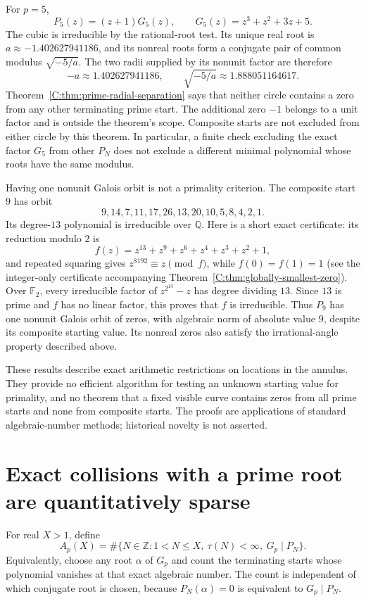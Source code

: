 \documentclass[11pt,a4paper]{article}
\theoremstyle{definition}
\theoremstyle{remark}
\numberwithin{equation}{section}
\begin{document}
For $p=5$,
\[
 P_5(z)=(z+1)G_5(z),\qquad G_5(z)=z^3+z^2+3z+5.
\]
The cubic is irreducible by the rational-root test. Its unique real
root is $a\approx-1.402627941186$, and its nonreal roots form a
conjugate pair of common modulus $\sqrt{-5/a}$.
The two radii supplied by its nonunit factor are therefore
\[
 -a\approx1.402627941186,\qquad
 \sqrt{-5/a}\approx1.888051164617.
\]
Theorem~\ref{C:thm:prime-radial-separation} says that neither circle
contains a zero from any other terminating prime start. The additional
zero $-1$ belongs to a unit factor and is outside the theorem's scope.
Composite starts are not excluded from either circle by this theorem.
In particular, a finite check excluding the exact factor $G_5$ from
other $P_N$ does not exclude a different minimal polynomial whose roots
have the same modulus.

Having one nonunit Galois orbit is not a primality criterion. The
composite start $9$ has orbit
\[
 9,14,7,11,17,26,13,20,10,5,8,4,2,1.
\]
Its degree-$13$ polynomial is irreducible over $\mathbb Q$. Here is a
short exact certificate: its reduction modulo $2$ is
\[
 f(z)=z^{13}+z^9+z^6+z^4+z^3+z^2+1,
\]
and repeated squaring gives $z^{8192}\equiv z\pmod f$, while
$f(0)=f(1)=1$ (see the integer-only certificate accompanying Theorem~\ref{C:thm:globally-smallest-zero}). Over $\mathbb F_2$, every irreducible factor of
$z^{2^{13}}-z$ has degree dividing $13$. Since $13$ is prime and
$f$ has no linear factor, this proves that $f$ is irreducible.
Thus $P_9$ has one nonunit Galois orbit of zeros, with algebraic norm
of absolute value $9$, despite its composite starting value.
Its nonreal zeros also satisfy the irrational-angle property described
above.

These results describe exact arithmetic restrictions on locations in
the annulus. They provide no efficient algorithm for testing an unknown
starting value for primality, and no theorem that a fixed visible curve
contains zeros from all prime starts and none from composite starts.
The proofs are applications of standard algebraic-number methods;
historical novelty is not asserted.
\section{Exact collisions with a prime root are quantitatively sparse}

For real $X>1$, define
\[
 A_p(X)=\#\{N\in\mathbb Z:1<N\le X,\ \tau(N)<\infty,
                         \ G_p\mid P_N\}.
\]
Equivalently, choose any root $\alpha$ of $G_p$ and count the terminating
starts whose polynomial vanishes at that exact algebraic number.
The count is independent of which conjugate root is chosen, because
$P_N(\alpha)=0$ is equivalent to $G_p\mid P_N$.
\end{document}
